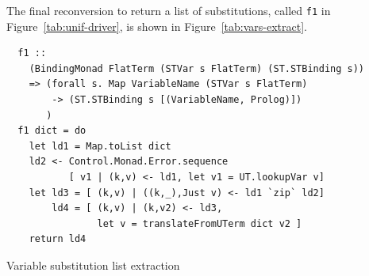 \documentclass[thesis-solanki.tex]{subfiles}
\begin{document}
The final reconversion to return a list of substitutions,
  called \texttt{f1} in Figure~\ref{tab:unif-driver}, is shown in
  Figure~\ref{tab:vars-extract}.
\begin{code-list}
  \begin{verbatim}
  f1 ::
    (BindingMonad FlatTerm (STVar s FlatTerm) (ST.STBinding s))
    => (forall s. Map VariableName (STVar s FlatTerm)
        -> (ST.STBinding s [(VariableName, Prolog)])
       )
  f1 dict = do
    let ld1 = Map.toList dict
    ld2 <- Control.Monad.Error.sequence
           [ v1 | (k,v) <- ld1, let v1 = UT.lookupVar v]
    let ld3 = [ (k,v) | ((k,_),Just v) <- ld1 `zip` ld2]
        ld4 = [ (k,v) | (k,v2) <- ld3,
                let v = translateFromUTerm dict v2 ]
    return ld4
  \end{verbatim}
  \vspace*{-1.0\baselineskip}
  \caption{Variable substitution list extraction}
  \label{tab:vars-extract}
\end{code-list}
\end{document}
